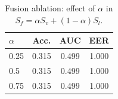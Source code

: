 \begin{table}[htbp]
  \centering
  \caption{Fusion ablation: effect of $\alpha$ in $S_f = \alpha S_v + (1-\alpha) S_l$.}
  \label{tab:ablation_alpha}
  \begin{tabular}{lccc}
    \toprule
    $\alpha$ & Acc. & AUC & EER \\
    \midrule
    0.25 & 0.315 & 0.499 & 1.000 \\
    0.5 & 0.315 & 0.499 & 1.000 \\
    0.75 & 0.315 & 0.499 & 1.000 \\
    \bottomrule
  \end{tabular}
\end{table}